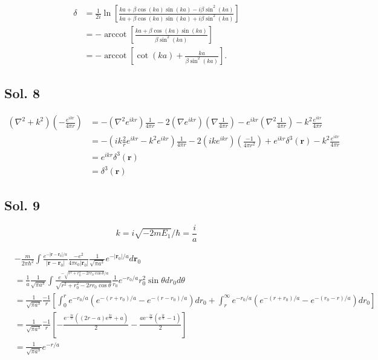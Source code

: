 \begin{align*}
    \delta & = \frac{1}{2i}
    \ln\left[
            \frac{ka+\beta \cos(ka)\sin(ka)
                -i\beta\sin^2(ka)}
            {ka+\beta \cos(ka)\sin(ka)
                +i\beta\sin^2(ka)}\right] \\
           & =-\operatorname{arccot}
    \left[
        \frac{ka+\beta\cos(ka)\sin(ka)}{\beta\sin^2(ka)}
        \right] \\
           & =
    -\operatorname{arccot}
    \left[\cot(ka) +
        \frac{ka}{\beta\sin^2(ka)}
        \right].
\end{align*}

\subsection*{Sol. 8}
\begin{align*}
    (\nabla^2 + k^2)(-\frac{e^{ikr}}{4\pi r})
     & =-(\nabla^2e^{ikr})\frac{1}{4\pi r}
    -2(\nabla e^{ikr})(\nabla\frac{1}{4\pi r})
    -e^{ikr}(\nabla^2\frac{1}{4\pi r})
    -k^2\frac{e^{ikr}}{4\pi r} \\
     & =-(ik\frac{2}{r}e^{ikr} - k^2e^{ikr} )\frac{1}{4\pi r}
    -2(ike^{ikr})(\frac{-1}{4\pi r^2})
    +e^{ikr}\delta^3(\bm r)-k^2\frac{e^{ikr}}{4\pi r} \\
     & =e^{ikr}\delta^3(\bm r) \\
     & =\delta^3(\bm r)
\end{align*}

\subsection*{Sol. 9}
$$
    k = i\sqrt{-2mE_1}/\hbar
    = \frac{i}{a}
$$

\begin{align*}
     & -\frac{m}{2\pi\hbar^2}
    \int \frac{e^{-|\bm r-\bm r_0|/a}}{|\bm r - \bm r_0|}\frac{-e^2}{4\pi\epsilon_0 |\bm r_0|}\frac{1}{\sqrt{\pi a^3}}
    e^{-|\bm r_0|/a}d\bm r_0 \\
     & =
    \frac{1}{a}
    \frac{1}{\sqrt{\pi a^3}}
    \int \frac{e^{-\sqrt{r^2+r_0^2-2rr_0\cos\theta }/a}}{\sqrt{r^2+r_0^2-2rr_0\cos\theta }}
    \frac{1}{r_0}
    e^{-r_0/a}r_0^2\sin\theta dr_0d\theta \\
     & =
    \frac{1}{\sqrt{\pi a^3}}
    \frac{-1}{r}
    \left[
        \int_0^{r}
        e^{-r_0/a}
        (e^{-(r+r_0)/a}
        -
        e^{-(r-r_0)/a}
        )
        dr_0
        +\int_r^\infty
        e^{-r_0/a}
        (e^{-(r+r_0)/a}
        -
        e^{-(r_0-r)/a}
        )
        dr_0
        \right] \\
     & =
    \frac{1}{\sqrt{\pi a^3}}
    \frac{-1}{r}
    \left[
        -\frac{\mathrm{e}^{-\frac{3r}{a}} \left(\left(2r - a\right) \mathrm{e}^{\frac{2r}{a}} + a\right)}{2}
        -\frac{a\mathrm{e}^{-\frac{3r}{a}} \left(\mathrm{e}^{\frac{2r}{a}} - 1\right)}{2}
        \right] \\
     & =
    \frac{1}{\sqrt{\pi a^3}}e^{-r/a}
\end{align*}


